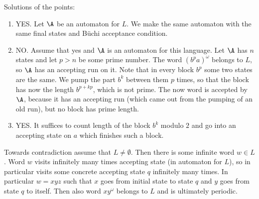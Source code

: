 
{
Solutions of the points:
\begin{enumerate}
  \item YES. Let $\A$ be an automaton for $L$. We make the same automaton with the same final states and B\"{u}chi
  acceptance condition.
  \item NO. Assume that yes and $\A$ is an automaton for this language. Let $\A$ has $n$ states
  and let $p > n$ be some prime number. The word $(b^p a)^\omega$ belongs to $L$,
  so $\A$ has an accepting run on it.
  Note that in every block $b^p$ some two states are the same. We pump the part $b^k$
  between them $p$ times, so that the block has now the length $b^{p + kp}$, which is not prime.
  The now word is accepted by $\A$, because it has an accepting run (which came out from the pumping of
  an old run), but no block has prime length.
  \item YES. It suffices to count length of the block $b^k$ modulo $2$ and go into an accepting state on $a$
  which finishes such a block.
\end{enumerate}
}

{
Towards contradiction assume that $L \neq \emptyset$. Then there is some infinite word $w \in L$.
Word $w$ visits infinitely many times accepting state (in automaton for $L$),
so in particular visits some concrete accepting state $q$ infinitely many times.
In particular $w = x y z$ such that $x$ goes from initial state to state $q$
and $y$ goes from state $q$ to itself. Then also word $x y^\omega$ belongs to $L$ and is ultimately periodic.
}

